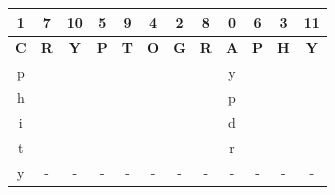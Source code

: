 \documentclass{ashoka-crypto}
\begin{document}
\begin{center}
\begin{tabular}{|c|c|c|c|c|c|c|c|c|c|c|c|}
\hline
1          & 7          & 10         & 5          & 9          & 4          & 2          & 8          & 0          & 6          & 3          & 11         \\ \hline
\textbf{C} & \textbf{R} & \textbf{Y} & \textbf{P} & \textbf{T} & \textbf{O} & \textbf{G} & \textbf{R} & \textbf{A} & \textbf{P} & \textbf{H} & \textbf{Y} \\ \hline
p          &            &            &            &            &            &            &            & y          &            &            &            \\ \hline
h          &            &            &            &            &            &            &            & p          &            &            &            \\ \hline
i          &            &            &            &            &            &            &            & d          &            &            &            \\ \hline
t          &            &            &            &            &            &            &            & r          &            &            &            \\ \hline
y         &     -       &    -        &      -     &     -       &      -      &     -       &     -       &      -      &     -       &       -     &  -            \\ \hline
\end{tabular}
\end{center}
\end{document}
